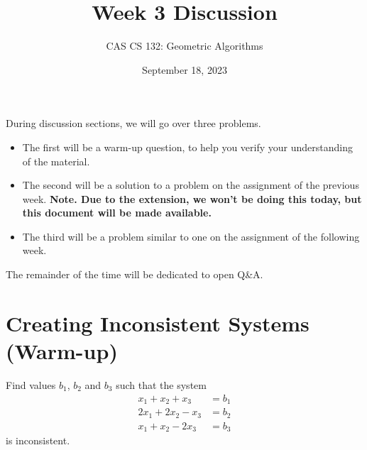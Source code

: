 \documentclass{article}
\title{Week 3 Discussion}
\author{CAS CS 132: Geometric Algorithms}
\date{September 18, 2023}
\theoremstyle{remark}
\begin{document}
\maketitle

\noindent During discussion sections, we will go over three problems.
\begin{itemize}
\item The first will be a warm-up question, to help you verify your understanding of the material.
\item The second will be a solution to a problem on the assignment of the previous week. \textbf{Note. Due to the extension, we won't be doing this today, but this document will be made available.}
\item The third will be a problem similar to one on the assignment of the following week.
\end{itemize}
The remainder of the time will be dedicated to open Q\&A.

\pagebreak
\section{Creating Inconsistent Systems (Warm-up)}

Find values $b_1$, $b_2$ and $b_3$ such that the system
\begin{align*}
  x_1 + x_2 + x_3 &= b_1 \\
  2x_1 + 2x_2 - x_3 &= b_2 \\
  x_1 + x_2 - 2x_3 &= b_3
\end{align*}
is inconsistent.
\end{document}
